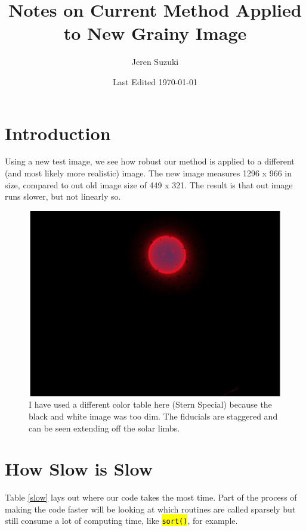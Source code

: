 \documentclass[10pt]{scrartcl}
\title{Notes on Current Method Applied to New Grainy Image}
\author{Jeren Suzuki}
\date{Last Edited \today}
\begin{document}
\maketitle
{}
\tableofcontents
\clearpage
{}

\section{Introduction} %
Using a new test image, we see how robust our method is applied to a different (and most likely more realistic) image. The new image measures 1296 x 966 in size, compared to out old image size of 449 x 321. The result is that out image runs slower, but not linearly so. \\

\begin{figure}[!ht]
    \centering
    \includegraphics[width=.9\textwidth]{../plots_tables_images/grainysun.eps}    
    \caption{I have used a different color table here (Stern Special) because the black and white image was too dim. The fiducials are staggered and can be seen extending off the solar limbs.}
    \label{grainy}
\end{figure}


\section{How Slow is Slow} %
\label{sec:how_slow_is_slow}
Table \ref{slow} lays out where our code takes the most time. Part of the process of making the code faster will be looking at which routines are called sparsely but still consume a lot of computing time, like \hl{\texttt{sort()}}, for example.
\end{document}
